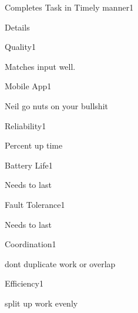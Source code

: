 \begin{nonfunctional_requirement}{Completes Task in Timely manner}{1}
\item Details
\end{nonfunctional_requirement}

\begin{nonfunctional_requirement}{Quality}{1}
\item Matches input well. 
\end{nonfunctional_requirement}

\begin{nonfunctional_requirement}{Mobile App}{1}
\item Neil go nuts on your bullshit
\end{nonfunctional_requirement}

\begin{nonfunctional_requirement}{Reliability}{1}
\item Percent up time
\end{nonfunctional_requirement}

\begin{nonfunctional_requirement}{Battery Life}{1}
\item Needs to last
\end{nonfunctional_requirement}

\begin{nonfunctional_requirement}{Fault Tolerance}{1}
\item Needs to last
\end{nonfunctional_requirement}

\begin{nonfunctional_requirement}{Coordination}{1}
\item dont duplicate work or overlap
\end{nonfunctional_requirement}

\begin{nonfunctional_requirement}{Efficiency}{1}
\item split up work evenly
\end{nonfunctional_requirement}